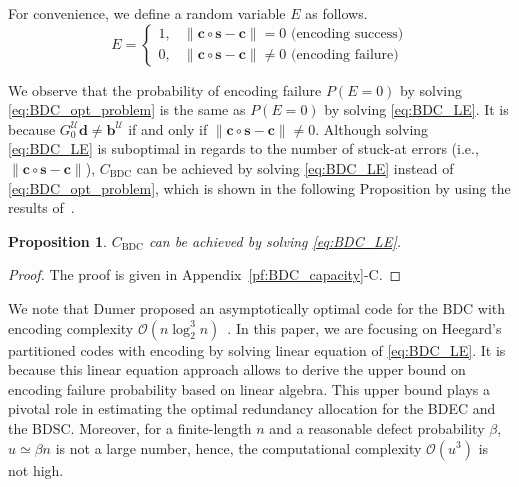 \documentclass[10pt,twocolumn,twoside,submit]{JCNtran}
\newtheorem{proposition}[theorem]{Proposition}
\begin{document}
	For convenience, we define a random variable $E$ as follows.
	\begin{equation} \label{eq:BDC_E}
	E =
	\begin{cases}
	1, & \|\mathbf{c} \circ \mathbf{s} - \mathbf{c} \| = 0 \text{ (encoding success)} \\
	0, & \|\mathbf{c} \circ \mathbf{s} - \mathbf{c} \| \ne 0 \text{ (encoding failure)}
	\end{cases}
	\end{equation}	
	
	We observe that the probability of encoding failure $P(E=0)$ by solving \eqref{eq:BDC_opt_problem} is the same as $P(E=0)$ by solving \eqref{eq:BDC_LE}. It is because $G_0^{\mathcal{U}} \mathbf{d} \ne  \mathbf{b}^{\mathcal{U}}$ if and only if $\|{\mathbf{c}} \circ {\mathbf{s}} - {\mathbf{c}} \| \ne 0$. Although solving \eqref{eq:BDC_LE} is suboptimal in regards to the number of stuck-at errors (i.e., $\|{\mathbf{c}} \circ {\mathbf{s}} - {\mathbf{c}} \|$), $C_{\text{BDC}}$ can be achieved by solving \eqref{eq:BDC_LE} instead of \eqref{eq:BDC_opt_problem}, which is shown in the following Proposition by using the results of~\cite{Heegard1983plbc}. 
	
	\begin{proposition} \label{thm:BDC_capacity}
		$C_{\text{BDC}}$ can be achieved by solving \eqref{eq:BDC_LE}.
	\end{proposition}
	\begin{proof}The proof is given in Appendix~\ref{pf:BDC_capacity}-C. 
	\end{proof}
	
	We note that Dumer proposed an asymptotically optimal code for the BDC with encoding complexity ${\mathcal{O}}\left(n \log_2^3{n}\right)$~\cite{Dumer1990}. In this paper, we are focusing on Heegard's partitioned codes with encoding by solving linear equation of \eqref{eq:BDC_LE}. It is because this linear equation approach allows to derive the upper bound on encoding failure probability based on linear algebra. This upper bound plays a pivotal role in estimating the optimal redundancy allocation for the BDEC and the BDSC. Moreover, for a finite-length $n$ and a reasonable defect probability $\beta$, $u \simeq \beta n$ is not a large number, hence, the computational complexity ${\mathcal{O}}(u^3)$ is not high.   %
	
\end{document}
